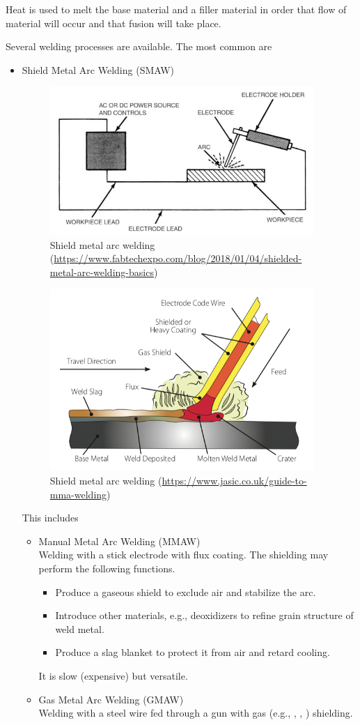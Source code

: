 Heat is used to melt the base material and a filler material in order that flow of material will occur and that fusion will take place.

Several welding processes are available. The most common are
\begin{itemize}
\item Shield Metal Arc Welding (SMAW)
\begin{figure}[H]\centering
\includegraphics[width=10cm]{PIC/CH07/SMAW1}
\caption{Shield metal arc welding (\href{https://www.fabtechexpo.com/blog/2018/01/04/shielded-metal-arc-welding-basics}{\url{https://www.fabtechexpo.com/blog/2018/01/04/shielded-metal-arc-welding-basics}})}
\end{figure}
\begin{figure}[H]\centering
\includegraphics[width=10cm]{PIC/CH07/SMAW}
\caption{Shield metal arc welding (\href{https://www.jasic.co.uk/guide-to-mma-welding}{\url{https://www.jasic.co.uk/guide-to-mma-welding}})}
\end{figure}
This includes
\begin{itemize}
\item Manual Metal Arc Welding (MMAW)\\Welding with a stick electrode with flux coating. The shielding may perform the following functions.
\begin{itemize}
\item Produce a gaseous shield to exclude air and stabilize the arc.
\item Introduce other materials, e.g., deoxidizers to refine grain structure of weld metal.
\item Produce a slag blanket to protect it from air and retard cooling.
\end{itemize}
It is slow (expensive) but versatile.
\item Gas Metal Arc Welding (GMAW)\\Welding with a steel wire fed through a gun with gas (e.g., , , ) shielding.


\end{itemize}
\end{itemize}
